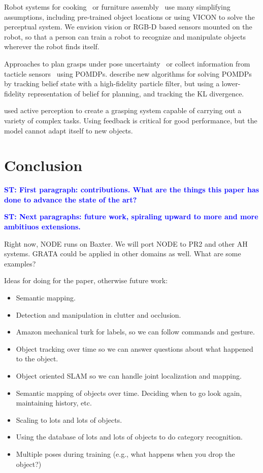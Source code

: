 \documentclass{article}
\newcommand{\stnote}[1]{\textcolor{blue}{\textbf{ST: #1}}}
\begin{document}
Robot systems for cooking~\citep{bollini12, beetz11} or furniture
assembly~\citep{knepper13} use many simplifying assumptions, including
pre-trained object locations or using VICON to solve the perceptual
system.  We envision vision or RGB-D based sensors mounted on the
robot, so that a person can train a robot to recognize and manipulate
objects wherever the robot finds itself.

Approaches to plan grasps under pose uncertainty~\citep{stulp11} or
collect information from tacticle sensors~\citep{hsiao10} using
POMDPs.  \citet{plat11} describe new algorithms for solving POMDPs by
tracking belief state with a high-fidelity particle filter, but using
a lower-fidelity representation of belief for planning, and tracking
the KL divergence.

\citet{hudson12} used active perception to create a grasping system
capable of carrying out a variety of complex tasks.  Using feedback is
critical for good performance, but the model cannot adapt itself to
new objects.



\section{Conclusion}

\stnote{First paragraph:  contributions.  What are the things this paper has done to advance the state of the art?}

\stnote{Next paragraphs: future work, spiraling upward to more and
  more ambitiuos extensions.}

Right now, NODE runs on Baxter. We will port NODE to PR2 and other AH systems.
GRATA could be applied in other domains as well.  What are some examples?

Ideas for doing for the paper, otherwise future work: 
\begin{itemize}
\item Semantic mapping. 
\item Detection and manipulation in clutter and occlusion.
\item Amazon mechanical turk for labels, so we can follow commands and gesture.
\item Object tracking over time so we can answer questions about what
  happened to the object.
\item Object oriented SLAM so we can handle joint localization and mapping.
\item Semantic mapping of objects over time.  Deciding when to go look
  again, maintaining history, etc. 
\item Scaling to lots and lots of objects.
\item Using the database of lots and lots of objects to do category recognition.
\item Multiple poses during training (e.g., what happens when you drop
  the object?)
\end{itemize}
\end{document}
